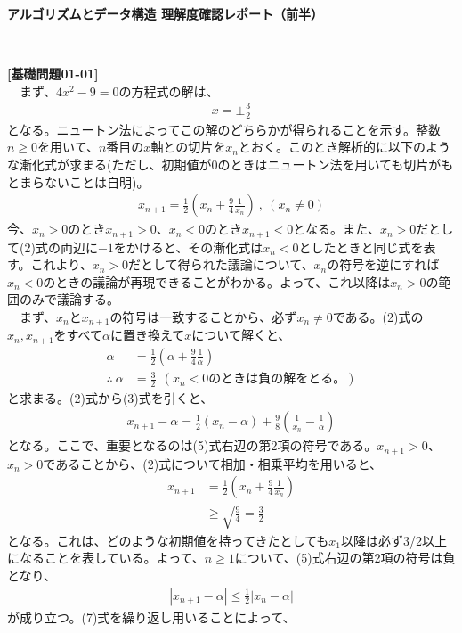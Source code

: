\documentclass[a4paper,10.5pt]{ltjsarticle}
\begin{document}
\centerline{\huge\bfseries アルゴリズムとデータ構造 理解度確認レポート（前半）}
\centerline{\ }
{\large\bfseries [基礎問題01-01]}\\
　まず、$4x^2-9=0$の方程式の解は、
\begin{align}
  x=\pm\frac{3}{2}
\end{align}
となる。ニュートン法によってこの解のどちらかが得られることを示す。整数$n\geq 0$を用いて、$n$番目の$x$軸との切片を$x_n$とおく。このとき解析的に以下のような漸化式が求まる(ただし、初期値が$0$のときはニュートン法を用いても切片がもとまらないことは自明)。
\begin{align}
  x_{n+1}=\frac{1}{2}\left(x_n+\frac{9}{4}\frac{1}{x_n}\right)\ ,\ (x_n\neq 0)
\end{align}
今、$x_n>0$のとき$x_{n+1}>0$、$x_n<0$のとき$x_{n+1}<0$となる。また、$x_n>0$だとして(2)式の両辺に$-1$をかけると、その漸化式は$x_n<0$としたときと同じ式を表す。これより、$x_n>0$だとして得られた議論について、$x_n$の符号を逆にすれば$x_n<0$のときの議論が再現できることがわかる。よって、これ以降は$x_n>0$の範囲のみで議論する。\\
　まず、$x_n$と$x_{n+1}$の符号は一致することから、必ず$x_n\neq 0$である。(2)式の$x_n,x_{n+1}$をすべて$\alpha$に置き換えて$x$について解くと、
\begin{align}
  \alpha&=\frac{1}{2}\left(\alpha+\frac{9}{4}\frac{1}{\alpha}\right)\\
  \therefore\ \alpha&=\frac{3}{2}\ \ (x_n<0のときは負の解をとる。)
\end{align}
と求まる。(2)式から(3)式を引くと、
\begin{align}
  x_{n+1}-\alpha=\frac{1}{2}(x_n-\alpha)+\frac{9}{8}\left(\frac{1}{x_n}-\frac{1}{\alpha}\right)
\end{align}
となる。ここで、重要となるのは(5)式右辺の第2項の符号である。$x_{n+1}>0$、$x_n>0$であることから、(2)式について相加・相乗平均を用いると、
\begin{align}
  　x_{n+1}&=\frac{1}{2}\left(x_n+\frac{9}{4}\frac{1}{x_n}\right)\nonumber\\[10pt]
  &\geq\sqrt{\frac{9}{4}}=\frac{3}{2}
\end{align}
となる。これは、どのような初期値を持ってきたとしても$x_1$以降は必ず3/2以上になることを表している。よって、$n\geq 1$について、(5)式右辺の第2項の符号は負となり、
\begin{align}
  |x_{n+1}-\alpha|\leq\frac{1}{2}|x_n-\alpha|
\end{align}
が成り立つ。(7)式を繰り返し用いることによって、
\end{document}
